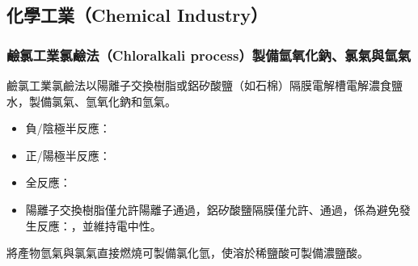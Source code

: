 \documentclass[a4paper,12pt]{report}
\begin{document}
\begin{itemize}
\begin{itemize}
\section{化學工業（Chemical Industry）}
\subsubsection{鹼氯工業氯鹼法（Chloralkali process）製備氫氧化鈉、氯氣與氫氣}
鹼氯工業氯鹼法以陽離子交換樹脂或鋁矽酸鹽（如石棉）隔膜電解槽電解濃食鹽水，製備氯氣、氫氧化鈉和氫氣。
\begin{itemize}
\item 負/陰極半反應：
\item 正/陽極半反應：
\item 全反應：
\item 陽離子交換樹脂僅允許陽離子通過，鋁矽酸鹽隔膜僅允許、通過，係為避免發生反應：，並維持電中性。
\end{itemize}
將產物氫氣與氯氣直接燃燒可製備氯化氫，使溶於稀鹽酸可製備濃鹽酸。

\end{itemize}
\end{itemize}
\end{document}
